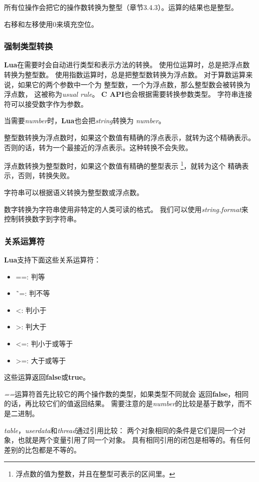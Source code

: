 \documentclass{ctexart}
\begin{document}
所有位操作会把它的操作数转换为整型（章节3.4.3）。运算的结果也是整型。

右移和左移使用0来填充空位。

\subsubsection{强制类型转换}

\textbf{Lua}在需要时会自动进行类型和表示方法的转换。
使用位运算时，总是把浮点数转换为整型数。
使用指数运算时，总是把整型数转换为浮点数。
对于算数运算来说，如果它的两个参数中一个为
整型数，一个为浮点数，那么整型数会被转换为浮点数，
这被称为\emph{usual rule}。
\textbf{C API}也会根据需要转换参数类型。
字符串连接符可以接受数字作为参数。

当需要\emph{number}时，\textbf{Lua}也会把\emph{string}转换为
\emph{number}。

整型数转换为浮点数时，如果这个数值有精确的浮点表示，就转为这个精确表示。
否则的话，转为一个最接近的浮点表示。这种转换不会失败。

浮点数转换为整型数时，如果这个数值有精确的整型表示
\footnote{浮点数的值为整数，并且在整型可表示的区间里。}，就转为这个
精确表示，否则，转换失败。

字符串可以根据语义转换为整型数或浮点数。

数字转换为字符串使用非特定的人类可读的格式。
我们可以使用\emph{string.format}来控制转换数字到字符串。

\subsubsection{关系运算符}

\textbf{Lua}支持下面这些关系运算符：

\begin{itemize}
\item ==: 判等
\item \~\ =: 判不等
\item <: 判小于
\item >: 判大于
\item <=: 判小于或等于
\item >=: 大于或等于
\end{itemize}

这些运算返回\textbf{false}或\textbf{true}。

\emph{==}运算符首先比较它的两个操作数的类型，如果类型不同就会
返回\textbf{false}，相同的话，再比较它们的值返回结果。
需要注意的是\emph{number}的比较是基于数学，而不是二进制。

\emph{table}，\emph{userdata}和\emph{thread}通过引用比较：
两个对象相同的条件是它们是同一个对象，也就是两个变量引用了同一个对象。
具有相同引用的闭包是相等的。有任何差别的比包都是不等的。
\end{document}
